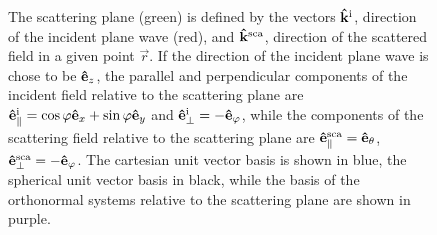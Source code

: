\begin{figure}[h!]
%
\caption[Scattering plane unit vector systems]{The scattering plane (green) is defined by the vectors $\vu{k}^\text{i}$, direction of the incident plane wave (red), and $\vu{k}^\text{sca}$, direction of the scattered field in a given point $\vec{r}$. If the direction of the incident plane wave is chose to be $\vu{e}_z$, the parallel and perpendicular components of the incident field relative to the scattering plane are $\vu{e}_\parallel^\text{i} = \cos\varphi\vu{e}_x +\sin\varphi\vu{e}_y$ and  $\vu{e}_\perp^\text{i} = -\vu{e}_\varphi$, while the components of the scattering field relative to the scattering plane are $\vu{e}_\parallel^\text{sca} = \vu{e}_\theta$, $\vu{e}_\perp^\text{sca} = - \vu{e}_\varphi$. The cartesian unit vector basis is shown in blue, the spherical unit vector basis in black, while the basis of the orthonormal systems relative to the scattering plane are shown in purple. }
\label{fig:ScatPlane}
	\end{figure}

